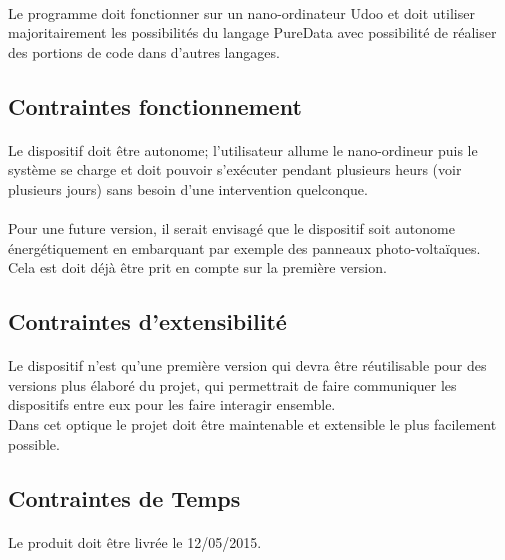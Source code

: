 \documentclass[a4paper, titlepage, oneside, 12pt]{article}%
\begin{document}
\paragraph{}
Le programme doit fonctionner sur un nano-ordinateur Udoo et doit utiliser majoritairement les possibilités du langage PureData avec possibilité de réaliser des portions de code dans d'autres langages.

\subsection{Contraintes fonctionnement}
\paragraph{}
Le dispositif doit être autonome; l'utilisateur allume le nano-ordineur puis le système se charge et doit pouvoir s’exécuter pendant plusieurs heurs (voir plusieurs jours) sans besoin d'une intervention quelconque.

\paragraph{}
Pour une future version, il serait envisagé que le dispositif soit autonome énergétiquement en embarquant par exemple des panneaux photo-voltaïques. Cela est doit déjà être prit en compte sur la première version.

\subsection{Contraintes d'extensibilité}
\paragraph{}
Le dispositif n'est qu'une première version qui devra être réutilisable pour des versions plus élaboré du projet, qui permettrait de faire communiquer les dispositifs entre eux pour les faire interagir ensemble.\\ Dans cet optique le projet doit être maintenable et extensible le plus facilement possible.

\subsection{Contraintes de Temps}
\paragraph{}
Le produit doit être livrée le 12/05/2015.
\end{document}
